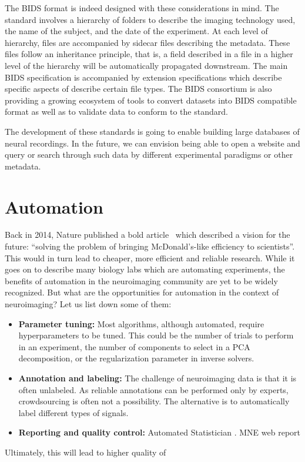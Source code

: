 The BIDS format is indeed designed with these considerations in mind. The standard involves a hierarchy of folders to describe the imaging technology used, the name of the subject, and the date of the experiment. At each level of hierarchy, files are accompanied by sidecar  files describing the metadata. These files follow an inheritance principle, that is, a field described in a  file in a higher level of the hierarchy will be automatically propagated downstream. The main BIDS specification is accompanied by extension specifications which describe specific aspects of describe certain file types. The BIDS consortium is also providing a growing ecosystem of tools to convert datasets into BIDS compatible format as well as to validate data to conform to the standard. 

The development of these standards is going to enable building large databases of neural recordings. In the future, we can envision being able to open a website and query or search through such data by different experimental paradigms or other metadata.

\section{Automation}
Back in 2014, Nature published a bold article~\citep{hayden2014automated} which described a vision for the future: ``solving the problem of bringing McDonald's-like efficiency to scientists''. This would in turn lead to cheaper, more efficient and reliable research. While it goes on to describe many biology labs which are automating experiments, the benefits of automation in the neuroimaging community are yet to be widely recognized. But what are the opportunities for automation in the context of neuroimaging? Let us list down some of them:
\begin{itemize}[noitemsep,nolistsep,nosep]
\item \textbf{Parameter tuning:} Most algorithms, although automated, require hyperparameters to be tuned. This could be the number of trials to perform in an experiment, the number of components to select in a \ac{PCA} decomposition, or the regularization parameter in inverse solvers.
\item \textbf{Annotation and labeling:} The challenge of neuroimaging data is that it is often unlabeled. As reliable annotations can be performed only by experts, crowdsourcing is often not a possibility. The alternative is to automatically label different types of signals.
\item \textbf{Reporting and quality control:} Automated Statistician . \ac{MNE} web report
\end{itemize}
Ultimately, this will lead to higher quality of 

